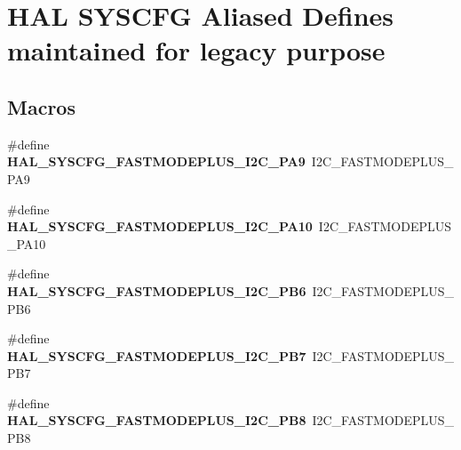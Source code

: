 \hypertarget{group___h_a_l___s_y_s_c_f_g___aliased___defines}{}\section{H\+AL S\+Y\+S\+C\+FG Aliased Defines maintained for legacy purpose}
\label{group___h_a_l___s_y_s_c_f_g___aliased___defines}
\subsection*{Macros}
\begin{DoxyCompactItemize}
\item 
\#define {\bfseries H\+A\+L\+\_\+\+S\+Y\+S\+C\+F\+G\+\_\+\+F\+A\+S\+T\+M\+O\+D\+E\+P\+L\+U\+S\+\_\+\+I2\+C\+\_\+\+P\+A9}~I2\+C\+\_\+\+F\+A\+S\+T\+M\+O\+D\+E\+P\+L\+U\+S\+\_\+\+P\+A9\hypertarget{group___h_a_l___s_y_s_c_f_g___aliased___defines_gab49ca938ca8481b3bd783423f840c1bd}{}\label{group___h_a_l___s_y_s_c_f_g___aliased___defines_gab49ca938ca8481b3bd783423f840c1bd}

\item 
\#define {\bfseries H\+A\+L\+\_\+\+S\+Y\+S\+C\+F\+G\+\_\+\+F\+A\+S\+T\+M\+O\+D\+E\+P\+L\+U\+S\+\_\+\+I2\+C\+\_\+\+P\+A10}~I2\+C\+\_\+\+F\+A\+S\+T\+M\+O\+D\+E\+P\+L\+U\+S\+\_\+\+P\+A10\hypertarget{group___h_a_l___s_y_s_c_f_g___aliased___defines_ga51ca865a9860b7a43fbb46fb768e3657}{}\label{group___h_a_l___s_y_s_c_f_g___aliased___defines_ga51ca865a9860b7a43fbb46fb768e3657}

\item 
\#define {\bfseries H\+A\+L\+\_\+\+S\+Y\+S\+C\+F\+G\+\_\+\+F\+A\+S\+T\+M\+O\+D\+E\+P\+L\+U\+S\+\_\+\+I2\+C\+\_\+\+P\+B6}~I2\+C\+\_\+\+F\+A\+S\+T\+M\+O\+D\+E\+P\+L\+U\+S\+\_\+\+P\+B6\hypertarget{group___h_a_l___s_y_s_c_f_g___aliased___defines_ga615cfdee08ad61f7b1581775e4e0385e}{}\label{group___h_a_l___s_y_s_c_f_g___aliased___defines_ga615cfdee08ad61f7b1581775e4e0385e}

\item 
\#define {\bfseries H\+A\+L\+\_\+\+S\+Y\+S\+C\+F\+G\+\_\+\+F\+A\+S\+T\+M\+O\+D\+E\+P\+L\+U\+S\+\_\+\+I2\+C\+\_\+\+P\+B7}~I2\+C\+\_\+\+F\+A\+S\+T\+M\+O\+D\+E\+P\+L\+U\+S\+\_\+\+P\+B7\hypertarget{group___h_a_l___s_y_s_c_f_g___aliased___defines_gaacdf5fce976c3d425f3aac760f4dc90d}{}\label{group___h_a_l___s_y_s_c_f_g___aliased___defines_gaacdf5fce976c3d425f3aac760f4dc90d}

\item 
\#define {\bfseries H\+A\+L\+\_\+\+S\+Y\+S\+C\+F\+G\+\_\+\+F\+A\+S\+T\+M\+O\+D\+E\+P\+L\+U\+S\+\_\+\+I2\+C\+\_\+\+P\+B8}~I2\+C\+\_\+\+F\+A\+S\+T\+M\+O\+D\+E\+P\+L\+U\+S\+\_\+\+P\+B8\hypertarget{group___h_a_l___s_y_s_c_f_g___aliased___defines_gad8342aebd8090a8777d84165d5726b62}{}\label{group___h_a_l___s_y_s_c_f_g___aliased___defines_gad8342aebd8090a8777d84165d5726b62}


\end{DoxyCompactItemize}
